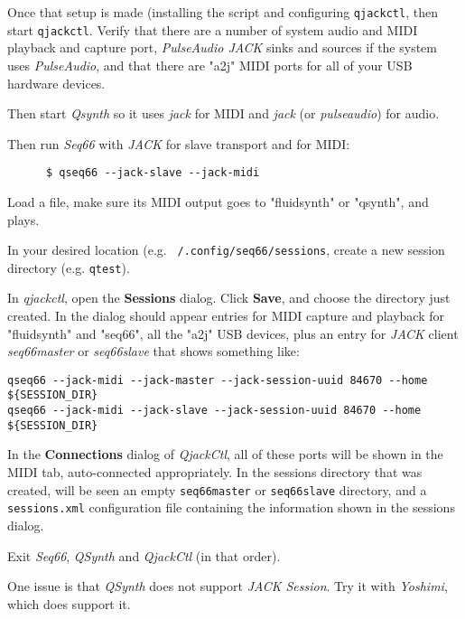    Once that setup is made (installing the script and configuring
   \texttt{qjackctl}, then start \texttt{qjackctl}.
   Verify that there are a number of system audio and MIDI playback and capture
   port, \textsl{PulseAudio JACK} sinks and sources if the system uses
   \textsl{PulseAudio}, and that there are "a2j" MIDI ports for all of your USB
   hardware devices.

   Then start \textsl{Qsynth} so it uses \textsl{jack} for MIDI and
   \textsl{jack} (or \textsl{pulseaudio}) for audio.

   Then run \textsl{Seq66} with \textsl{JACK} for slave transport and for MIDI:

   \begin{verbatim}
      $ qseq66 --jack-slave --jack-midi
   \end{verbatim}

   Load a file, make sure its MIDI output goes to "fluidsynth" or "qsynth", and
   plays.

   In your desired location (e.g. \texttt{~/.config/seq66/sessions},
   create a new session directory (e.g. \texttt{qtest}).

   In \textsl{qjackctl}, open the \textbf{Sessions} dialog.
   Click \textbf{Save}, and choose the directory just created.
   In the dialog should appear entries for MIDI capture and playback for
   "fluidsynth" and "seq66", all the "a2j" USB devices,
   plus an entry for \textsl{JACK} client
   \textsl{seq66master} or \textsl{seq66slave} that shows
   something like:

   \begin{verbatim}
qseq66 --jack-midi --jack-master --jack-session-uuid 84670 --home ${SESSION_DIR}
qseq66 --jack-midi --jack-slave --jack-session-uuid 84670 --home ${SESSION_DIR}
   \end{verbatim}

   In the \textbf{Connections} dialog of \textsl{QjackCtl}, all of these ports
   will be shown in the MIDI tab, auto-connected appropriately.
   In the sessions directory that was created, will be seen an
   empty \texttt{seq66master}
   or \texttt{seq66slave} directory, and a
   \texttt{sessions.xml} configuration file containing the information shown in
   the sessions dialog.

   Exit \textsl{Seq66}, \textsl{QSynth} and \textsl{QjackCtl}
   (in that order).

   One issue is that \textsl{QSynth}
   does not support \textsl{JACK Session}.
   Try it with \textsl{Yoshimi}, which does support it.

